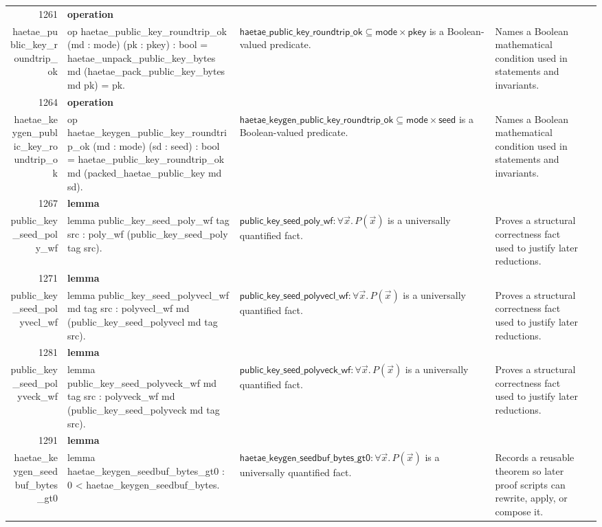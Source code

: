\documentclass[10pt]{article}
\newcommand{\ec}[1]{\begingroup\ttfamily\scriptsize #1\endgroup}
\begin{document}
\begin{longtable}{r L{0.17\textwidth} L{0.26\textwidth} L{0.27\textwidth} L{0.20\textwidth}}
1261 & \textbf{operation}\\\ec{haetae\_public\_key\_roundtrip\_ok} & \ec{op haetae\_public\_key\_roundtrip\_ok (md : mode) (pk : pkey) : bool = haetae\_unpack\_public\_key\_bytes md (haetae\_pack\_public\_key\_bytes md pk) = pk.} & \(\mathsf{haetae\_public\_key\_roundtrip\_ok} \subseteq \mathsf{mode} \times \mathsf{pkey}\) is a Boolean-valued predicate. & Names a Boolean mathematical condition used in statements and invariants. \\
1264 & \textbf{operation}\\\ec{haetae\_keygen\_public\_key\_roundtrip\_ok} & \ec{op haetae\_keygen\_public\_key\_roundtrip\_ok (md : mode) (sd : seed) : bool = haetae\_public\_key\_roundtrip\_ok md (packed\_haetae\_public\_key md sd).} & \(\mathsf{haetae\_keygen\_public\_key\_roundtrip\_ok} \subseteq \mathsf{mode} \times \mathsf{seed}\) is a Boolean-valued predicate. & Names a Boolean mathematical condition used in statements and invariants. \\
1267 & \textbf{lemma}\\\ec{public\_key\_seed\_poly\_wf} & \ec{lemma public\_key\_seed\_poly\_wf tag src : poly\_wf (public\_key\_seed\_poly tag src).} & \(\mathsf{public\_key\_seed\_poly\_wf} : \forall \vec{x}.\, P(\vec{x})\) is a universally quantified fact. & Proves a structural correctness fact used to justify later reductions. \\
1271 & \textbf{lemma}\\\ec{public\_key\_seed\_polyvecl\_wf} & \ec{lemma public\_key\_seed\_polyvecl\_wf md tag src : polyvecl\_wf md (public\_key\_seed\_polyvecl md tag src).} & \(\mathsf{public\_key\_seed\_polyvecl\_wf} : \forall \vec{x}.\, P(\vec{x})\) is a universally quantified fact. & Proves a structural correctness fact used to justify later reductions. \\
1281 & \textbf{lemma}\\\ec{public\_key\_seed\_polyveck\_wf} & \ec{lemma public\_key\_seed\_polyveck\_wf md tag src : polyveck\_wf md (public\_key\_seed\_polyveck md tag src).} & \(\mathsf{public\_key\_seed\_polyveck\_wf} : \forall \vec{x}.\, P(\vec{x})\) is a universally quantified fact. & Proves a structural correctness fact used to justify later reductions. \\
1291 & \textbf{lemma}\\\ec{haetae\_keygen\_seedbuf\_bytes\_gt0} & \ec{lemma haetae\_keygen\_seedbuf\_bytes\_gt0 : 0 < haetae\_keygen\_seedbuf\_bytes.} & \(\mathsf{haetae\_keygen\_seedbuf\_bytes\_gt0} : \forall \vec{x}.\, P(\vec{x})\) is a universally quantified fact. & Records a reusable theorem so later proof scripts can rewrite, apply, or compose it. \\

\end{longtable}
\end{document}
